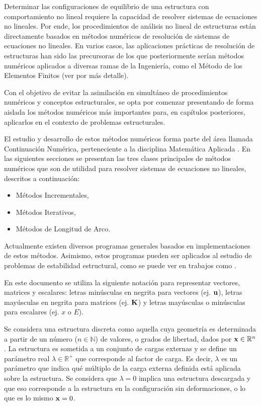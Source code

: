 Determinar las configuraciones de equilibrio de una estructura con comportamiento no lineal requiere la capacidad de resolver sistemas de ecuaciones no lineales. Por ende, los procedimientos de análisis no lineal de estructuras están directamente basados en métodos numéricos de resolución de sistemas de ecuaciones no lineales. %
%
En varios casos, las aplicaciones prácticas de resolución de estructuras han sido las precursoras de los que posteriormente serían métodos numéricos aplicados a diversas ramas de la Ingeniería, como el Método de los Elementos Finitos \citep{Zienkiewicz1972} (ver  \citep{crisfield1996non,Bathe2014} por más detalle).

Con el objetivo de evitar la asimilación en simultáneo de procedimientos numéricos y conceptos estructurales, se opta por comenzar presentando de forma aislada los métodos numéricos más importantes para, en capítulos posteriores, aplicarlos en el contexto de problemas estructurales. 

El estudio y desarrollo de estos métodos numéricos forma parte del área llamada Continuación Numérica, perteneciente a la disciplina Matemática Aplicada \citep{Doedl2014Slides}. %
%
En las siguientes secciones se presentan las tres clases principales de métodos numéricos que son de utilidad para resolver sistemas de ecuaciones no lineales, descritos a continuación: %
%
%
\begin{itemize}
	\item Métodos Incrementales,
	\item Métodos Iterativos,
	\item Métodos de Longitud de Arco.
\end{itemize}

Actualmente existen diversos programas generales basados en implementaciones de estos métodos. %
%
Asimismo, estos programas pueden ser aplicados al estudio de problemas de estabilidad estructural, como se puede ver en trabajos como \citep{Wadee245}.

En este documento se utiliza la siguiente notación para representar vectores, matrices y escalares: letras minúsculas en negrita para vectores (ej. ${\bf u}$), letras mayúsculas en negrita para matrices (ej. ${\bf K}$) y letras mayúsculas o minúsculas para escalares (ej. $x$ o $E$).

Se considera una estructura discreta como aquella cuya geometría es determinada a partir de un número ($n\in\mathbb{N}$) de valores, o grados de libertad, dados por ${\bf x}\in \mathbb{R}^n$. %
%
La estructura es sometida a un conjunto de cargas externas y se define un parámetro real $\lambda\in \mathbb{R}^+$ que corresponde al factor de carga. %
%
Es decir, $\lambda$ es un parámetro que indica qué múltiplo de la carga externa definida está aplicada sobre la estructura. %
%
Se considera que $\lambda=0$ implica una estructura descargada y que eso corresponde a la estructura en la configuración sin deformaciones, o lo que es lo mismo ${\bf x}=0$.


